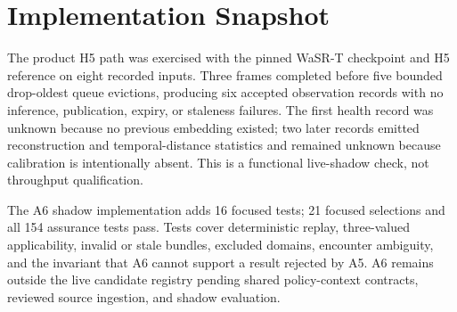 \documentclass[sigconf,nonacm]{acmart}
\begin{document}
\section{Implementation Snapshot}
The product H5 path was exercised with the pinned WaSR-T checkpoint and H5
reference on eight recorded inputs. Three frames completed before five bounded
drop-oldest queue evictions, producing six accepted observation records with no
inference, publication, expiry, or staleness failures. The first health record
was unknown because no previous embedding existed; two later records emitted
reconstruction and temporal-distance statistics and remained unknown because
calibration is intentionally absent. This is a functional live-shadow check,
not throughput qualification.

The A6 shadow implementation adds 16 focused tests; 21 focused selections and
all 154 assurance tests pass. Tests cover deterministic replay, three-valued
applicability, invalid or stale bundles, excluded domains, encounter ambiguity,
and the invariant that A6 cannot support a result rejected by A5. A6 remains
outside the live candidate registry pending shared policy-context contracts,
reviewed source ingestion, and shadow evaluation.
\end{document}

